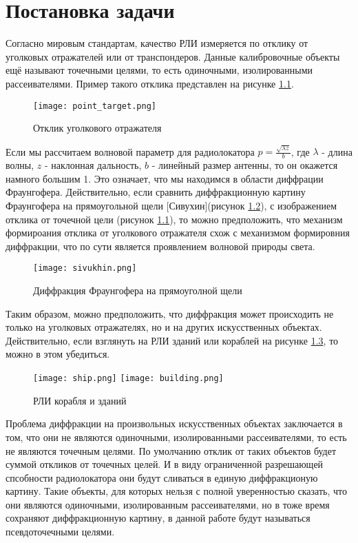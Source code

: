 \chapter{Постановка задачи}
\label{sec:Chapter1} 

	Согласно мировым стандартам, качество РЛИ измеряется по отклику от уголковых отражателей или от транспондеров. Данные калибровочные объекты ещё называют точечными целями, то есть одиночными, изолированными рассеивателями. Пример такого отклика представлен на рисунке \ref{fig:point_target}.
	
\begin{figure}[ht]
    \centering
    \texttt{[image: point\_target.png]}
    \caption{Отклик уголкового отражателя}
    \label{fig:point_target}
\end{figure}
	
	Если мы рассчитаем волновой параметр для радиолокатора $ p = \frac{\sqrt{\lambda z}}{b} $, где $ \lambda $ - длина волны, $ z $ - наклонная дальность, $ b $ - линейный размер антенны, то он окажется намного большим 1. Это означает, что мы находимся в области диффрации Фраунгофера. Действительно, если сравнить диффракционную картину Фраунгофера на прямоугольной щели [Сивухин](рисунок \ref{fig:sivukhin}), с изображением отклика от точечной цели (рисунок \ref{fig:point_target}), то можно предположить, что механизм формироания отклика от уголкового отражателя схож с механизмом формировния диффракции, что по сути является проявлением волновой природы света.

\begin{figure}[ht]
    \centering
    \texttt{[image: sivukhin.png]}
    \caption{Диффракция Фраунгофера на прямоуголной щели}
    \label{fig:sivukhin}
\end{figure}
	
	Таким образом, можно предположить, что диффракция может происходить не только на уголковых отражателях, но и на других искусственных объектах. Действительно, если взглянуть на РЛИ зданий или кораблей на рисунке \ref{fig:ship_build}, то можно в этом убедиться.
	
\begin{figure}[ht]
    \centering
    \texttt{[image: ship.png]}
    \texttt{[image: building.png]}
    \caption{РЛИ корабля и зданий}
    \label{fig:ship_build}
\end{figure}
		
	Проблема диффракции на произвольных искусственных объектах заключается в том, что они не являются одиночными, изолированными рассеивателями, то есть не являются точечным целями. По умолчанию отклик от таких объектов будет суммой откликов от точечных целей. И в виду ограниченной разрешающей спсобности радиолокатора они будут сливаться в единую диффракционую картину. Такие объекты, для которых нельзя с полной уверенностью сказать, что они являются одиночными, изолированным рассеивателями, но в тоже время сохраняют диффракционную картину, в данной работе будут называться псевдоточечными целями. 

